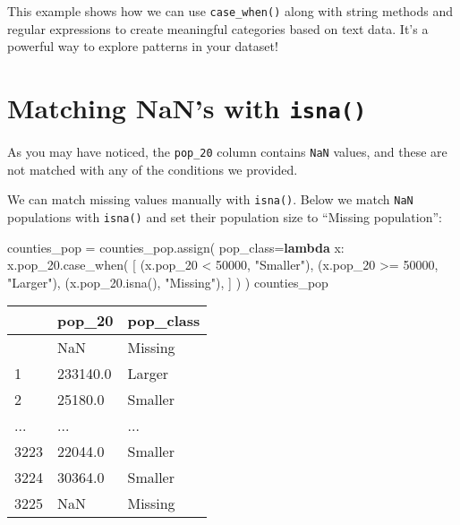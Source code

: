 \documentclass[
  letterpaper,
  DIV=11,
  numbers=noendperiod]{scrreprt}
\newenvironment{Shaded}{\begin{snugshade}}{\end{snugshade}}
\newcommand{\DecValTok}[1]{\textcolor[rgb]{0.68,0.00,0.00}{#1}}
\newcommand{\KeywordTok}[1]{\textcolor[rgb]{0.00,0.23,0.31}{\textbf{#1}}}
\newcommand{\NormalTok}[1]{\textcolor[rgb]{0.00,0.23,0.31}{#1}}
\newcommand{\OperatorTok}[1]{\textcolor[rgb]{0.37,0.37,0.37}{#1}}
\newcommand{\StringTok}[1]{\textcolor[rgb]{0.13,0.47,0.30}{#1}}
\begin{document}
This example shows how we can use \texttt{case\_when()} along with
string methods and regular expressions to create meaningful categories
based on text data. It's a powerful way to explore patterns in your
dataset!

\section{\texorpdfstring{Matching NaN's with
\texttt{isna()}}{Matching NaN's with isna()}}\label{matching-nans-with-isna}

As you may have noticed, the \texttt{pop\_20} column contains
\texttt{NaN} values, and these are not matched with any of the
conditions we provided.

We can match missing values manually with \texttt{isna()}. Below we
match \texttt{NaN} populations with \texttt{isna()} and set their
population size to ``Missing population'':

\begin{Shaded}
\begin{Highlighting}[]
\NormalTok{counties\_pop }\OperatorTok{=}\NormalTok{ counties\_pop.assign(}
\NormalTok{    pop\_class}\OperatorTok{=}\KeywordTok{lambda}\NormalTok{ x: x.pop\_20.case\_when(}
\NormalTok{        [}
\NormalTok{            (x.pop\_20 }\OperatorTok{\textless{}} \DecValTok{50000}\NormalTok{, }\StringTok{"Smaller"}\NormalTok{),}
\NormalTok{            (x.pop\_20 }\OperatorTok{\textgreater{}=} \DecValTok{50000}\NormalTok{, }\StringTok{"Larger"}\NormalTok{),}
\NormalTok{            (x.pop\_20.isna(), }\StringTok{"Missing"}\NormalTok{),}
\NormalTok{        ]}
\NormalTok{    )}
\NormalTok{)}
\NormalTok{counties\_pop}
\end{Highlighting}
\end{Shaded}

\begin{longtable}[]{@{}lll@{}}
\toprule\noalign{}
& pop\_20 & pop\_class \\
\midrule\noalign{}
\endhead
\bottomrule\noalign{}
\endlastfoot
0 & NaN & Missing \\
1 & 233140.0 & Larger \\
2 & 25180.0 & Smaller \\
... & ... & ... \\
3223 & 22044.0 & Smaller \\
3224 & 30364.0 & Smaller \\
3225 & NaN & Missing \\
\end{longtable}
\end{document}
